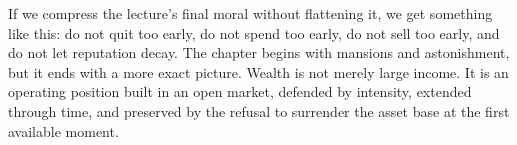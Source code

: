 If we compress the lecture's final moral without flattening it, we get something like this: do not quit too early, do not spend too early, do not sell too early, and do not let reputation decay. The chapter begins with mansions and astonishment, but it ends with a more exact picture. Wealth is not merely large income. It is an operating position built in an open market, defended by intensity, extended through time, and preserved by the refusal to surrender the asset base at the first available moment.